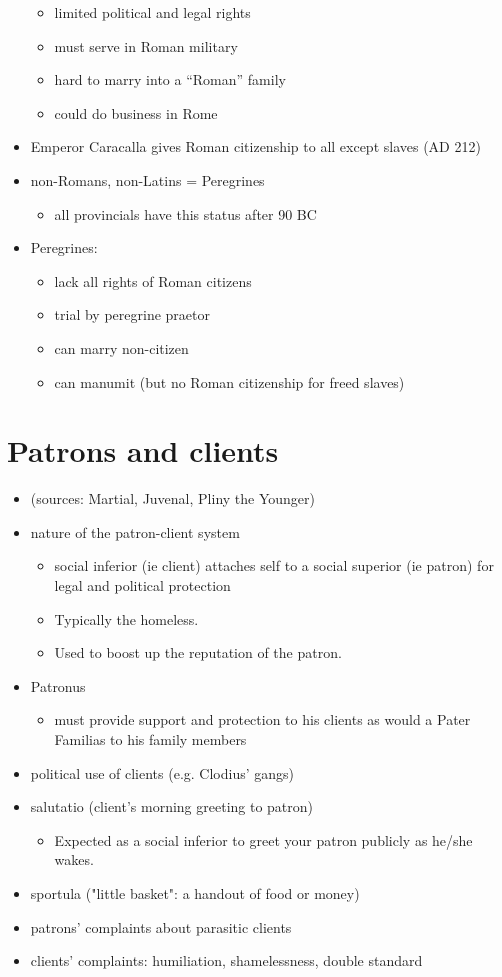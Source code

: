 \documentclass[12pt, twoside]{article}
\begin{document}
\begin{itemize}
\begin{itemize}
	\item limited political and legal rights
	\item must serve in Roman military
	\item hard to marry into a “Roman” family
	\item could do business in Rome
	\end{itemize}
\item Emperor Caracalla gives Roman citizenship to all except slaves (AD 212)
\item non-Romans, non-Latins = Peregrines 
	\begin{itemize}
	\item all provincials have this status after 90 BC
	\end{itemize}
\item Peregrines: 
	\begin{itemize}
	\item lack all rights of Roman citizens
	\item trial by peregrine praetor
	\item can marry non-citizen
	\item can manumit (but no Roman citizenship for freed slaves)
	\end{itemize}
\end{itemize}

\section {Patrons and clients}
\begin{itemize}
\item (sources: Martial, Juvenal, Pliny the Younger)
\item nature of the patron-client system
	\begin{itemize}
	\item social inferior (ie client) attaches self to a social superior (ie patron) for legal and political protection
	\item Typically the homeless.
	\item Used to boost up the reputation of the patron.
	\end{itemize}
\item Patronus
	\begin{itemize}
	\item must provide support and protection to his clients as would a Pater Familias to his family members
	\end{itemize}
\item political use of clients (e.g. Clodius' gangs)
\item salutatio (client's morning greeting to patron)
	\begin{itemize}
	\item Expected as a social inferior to greet your patron publicly as he/she wakes.  
	\end{itemize}
\item sportula ("little basket": a handout of food or money)
\item patrons' complaints about parasitic clients
\item clients' complaints: humiliation, shamelessness, double standard
\end{itemize}
\end{document}
